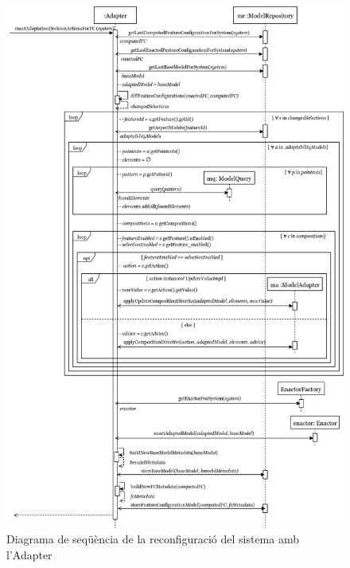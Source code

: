 \begin{figure}[!h]
\centering
\includegraphics[width=13cm]{Figures/Figure22}
\decoRule
\caption{Diagrama de seqüència de la reconfiguració del sistema amb l'Adapter}
\label{fig:Figura22}
\end{figure}
